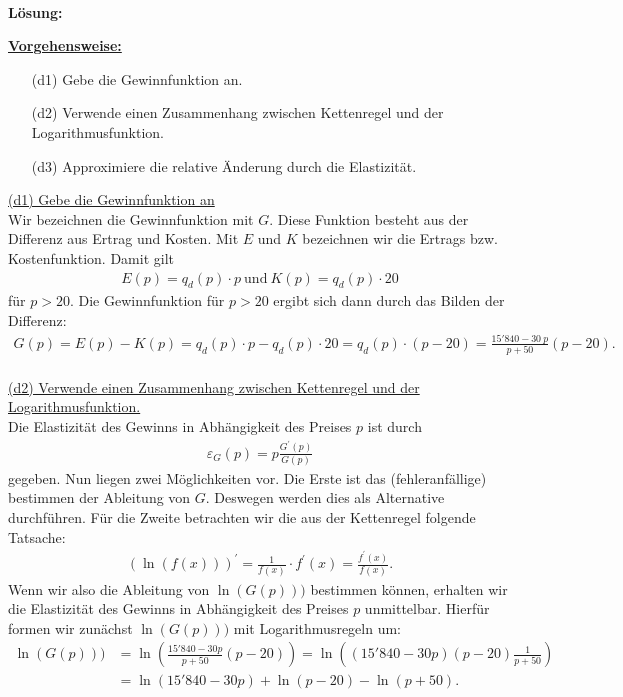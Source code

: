 \ \\
\textbf{Lösung:}
\begin{mdframed}
	\underline{\textbf{Vorgehensweise:}}
	\begin{enumerate}
		\item[(d1)] Gebe die Gewinnfunktion an.
		\item[(d2)] Verwende einen Zusammenhang zwischen Kettenregel und der Logarithmusfunktion.
		\item[(d3)] Approximiere die relative Änderung durch die Elastizität.
	\end{enumerate}
\end{mdframed}

\underline{(d1) Gebe die Gewinnfunktion an}\\
Wir bezeichnen die Gewinnfunktion mit  $ G $. Diese Funktion besteht aus der Differenz aus Ertrag und Kosten. Mit $ E $ und $ K $ bezeichnen wir die Ertrags bzw. Kostenfunktion.
Damit gilt
\begin{align*}
	E(p) = q_d(p) \cdot p \ \textrm{und} \ K(p) = q_d(p) \cdot 20
\end{align*}
für $ p >20 $. 
Die Gewinnfunktion für $ p > 20 $ ergibt sich dann durch das Bilden der Differenz:
\begin{align*}
	G(p)
	= 
	E(p) -  K(p)
	=
	q_d(p) \cdot p - q_d(p) \cdot 20
	=
	q_d(p) \cdot (p -20)
	=
	\frac{15'840 - 30 \ p}{p + 50} (p -20).
\end{align*}
\ \\
\underline{(d2) Verwende einen Zusammenhang zwischen Kettenregel und der Logarithmusfunktion.}\\
Die Elastizität des Gewinns in Abhängigkeit des Preises $ p $ ist durch
\begin{align*}
	\varepsilon_{G}(p) = p \frac{G^\prime(p)}{G(p)}
\end{align*}
gegeben. Nun liegen zwei Möglichkeiten vor. Die Erste ist das (fehleranfällige) bestimmen der Ableitung von $ G $. Deswegen werden dies als Alternative durchführen.
Für die Zweite betrachten wir die aus der Kettenregel folgende Tatsache:
\begin{align*}
	(\ln(f(x)))^\prime = \frac{1}{f(x)} \cdot f^\prime(x)  = \frac{f^\prime(x)}{f(x)}.
\end{align*}
Wenn wir also die Ableitung von $ \ln(G(p))) $ bestimmen können, erhalten wir die Elastizität des Gewinns in Abhängigkeit des Preises $ p $ unmittelbar.
Hierfür formen wir zunächst $ \ln(G(p))) $ mit Logarithmusregeln um:
\begin{align*}
	\ln(G(p)))
	&=
	\ln \left(\frac{15'840 - 30  p}{p + 50} (p -20)\right)
	=
	\ln \left((15'840 - 30  p)(p -20) \frac{1}{p + 50}\right)\\
	&=
	\ln(15'840 - 30  p) + \ln(p -20) - \ln(p + 50).
\end{align*}
